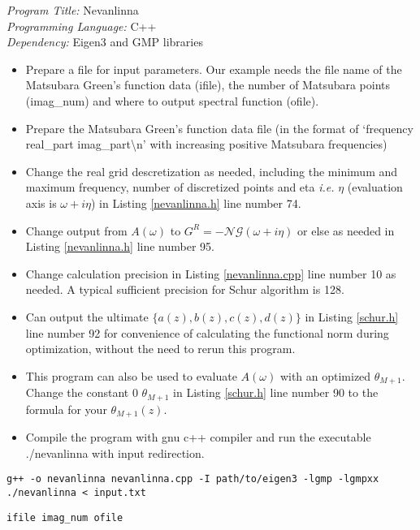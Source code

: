 \documentclass[onecolumn,amsmath,notitlepage,aps,prl,10pt,superscriptaddress,floatfix,letterpaper
]{revtex4-2}
\begin{document}
\small
\noindent \textit{Program Title:} Nevanlinna\\
\textit{Programming Language:} C++\\
\textit{Dependency:} Eigen3 and GMP libraries\\
\begin{itemize}
\itemsep0em
\item Prepare a file for input parameters. Our example needs the file name of the Matsubara Green's function data (ifile), the number of Matsubara points (imag\_num) and where to output spectral function (ofile).
\item Prepare the Matsubara Green's function data file (in the format of `frequency real\_part imag\_part\textbackslash n' with increasing positive Matsubara frequencies)
\item Change the real grid descretization as needed, including the minimum and maximum frequency, number of discretized points and eta \textit{i.e.} $\eta$ (evaluation axis is $\omega + i\eta$) in Listing \ref{nevanlinna.h} line number 74.
\item Change output from $A(\omega)$ to $G^R=-\mathcal{NG}(\omega+i\eta)$ or else as needed in Listing \ref{nevanlinna.h} line number 95.
\item Change calculation precision in Listing \ref{nevanlinna.cpp} line number 10 as needed. A typical sufficient precision for Schur algorithm is 128.
\item Can output the ultimate $\{a(z), b(z), c(z), d(z)\}$ in Listing \ref{schur.h} line number 92 for convenience of calculating the functional norm during optimization, without the need to rerun this program.
\item This program can also be used to evaluate $A(\omega)$ with an optimized $\theta_{M+1}$. Change the constant 0 $\theta_{M+1}$ in Listing \ref{schur.h} line number 90 to the formula for your $\theta_{M+1}(z)$.
\item Compile the program with gnu c++ compiler and run the executable ./nevanlinna with input redirection.
\end{itemize}

\begin{lstlisting}[caption=compile and run the program]
g++ -o nevanlinna nevanlinna.cpp -I path/to/eigen3 -lgmp -lgmpxx
./nevanlinna < input.txt
\end{lstlisting}

\begin{lstlisting}[caption=input.txt]
ifile imag_num ofile
\end{lstlisting}
\end{document}
